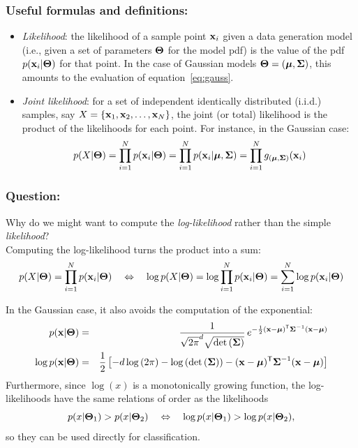 \documentclass[a4paper]{article}
\newcommand{\trn}{^{\mathsf T}} %
\newcommand{\xv}{\ensuremath\mathbf{x}}  %
\newcommand{\muv}{\ensuremath\boldsymbol{\mu}}  %
\newcommand{\Sm}{\ensuremath\boldsymbol{\Sigma}}  %
\newcommand{\Tm}{\ensuremath\boldsymbol{\Theta}}  %
\begin{document}
\subsubsection*{Useful formulas and definitions:}
\begin{itemize}
\item {\em Likelihood}: the likelihood of a sample point $\xv_i$ given
  a data generation model (i.e., given a set of parameters $\Tm$ for
  the model pdf) is the value of the pdf $p(\xv_i|\Tm)$ for that
  point. In the case of Gaussian models $\Tm = (\muv,\Sm)$, this
  amounts to the evaluation of equation~\ref{eq:gauss}.
\item {\em Joint likelihood}: for a set of independent identically
  distributed (i.i.d.) samples, say $X = \{\xv_1, \xv_2, \ldots, \xv_N
  \}$, the joint (or total) likelihood is the product of the
  likelihoods for each point. For instance, in the Gaussian case:
  \begin{equation}
    \label{eq:joint-likelihood}
    p(X|\Tm) =
    \prod_{i=1}^{N} p(\xv_i|\Tm) =
    \prod_{i=1}^{N} p(\xv_i|\muv,\Sm) =
    \prod_{i=1}^{N} g_{(\muv,\Sm)}(\xv_i)
  \end{equation}
\end{itemize}


\subsubsection{Question:}
Why do we might want to compute the {\em log-likelihood} rather than
the simple {\em likelihood}?
\\

Computing the log-likelihood turns the product into a sum:
\[
p(X|\Tm) = \prod_{i=1}^{N} p(\xv_i|\Tm) \quad \Leftrightarrow \quad
\log p(X|\Tm) = \log \prod_{i=1}^{N} p(\xv_i|\Tm) = \sum_{i=1}^{N}
\log p(\xv_i|\Tm)
\]

In the Gaussian case, it also avoids the computation of the exponential:
\begin{eqnarray}
  \label{eq:loglikely}
  p(\xv|\Tm) & = & \frac{1}{\sqrt{2\pi}^d \sqrt{\det\left(\Sm\right)}}
  \, e^{-\frac{1}{2} (\xv-\muv)\trn \Sm^{-1} (\xv-\muv)} \nonumber \\
  \log p(\xv|\Tm) & = &
  \frac{1}{2} \left[-d \log \left( 2\pi \right)
    -  \log \left( \det\left(\Sm\right) \right)
    -  (\xv-\muv)\trn \Sm^{-1} (\xv-\muv)\right]
\end{eqnarray}
Furthermore, since $\log(x)$ is a monotonically growing function, the
log-likelihoods have the same relations of order as the likelihoods
\[
p(x|\Tm_1) > p(x|\Tm_2) \quad \Leftrightarrow \quad
\log p(x|\Tm_1) > \log p(x|\Tm_2),
\]
so they can be used directly for classification.
\end{document}
